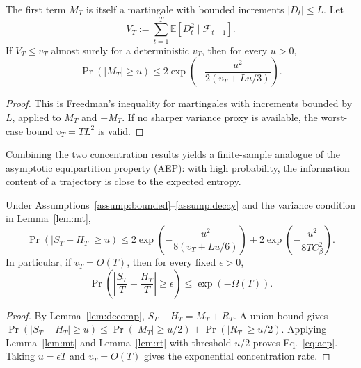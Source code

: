 \begin{lemma}[Concentration of $M_T$]
\label{lem:mt}
The first term $M_T$ is itself a martingale with bounded increments $|D_t| \le L$. Let
\begin{equation}
  V_T:=\sum_{t=1}^{T}\mathbb{E}[D_t^2\mid\mathcal{F}_{t-1}].
\end{equation}
If $V_T\le v_T$ almost surely for a deterministic $v_T$, then for every $u>0$,
\begin{equation}
  \Pr(|M_T|\ge u)
  \le 2\exp\!\left(-\frac{u^2}{2(v_T+Lu/3)}\right).
  \label{eq:mt-freedman}
\end{equation}
\end{lemma}

\begin{proof}
This is Freedman's inequality for martingales with increments bounded by $L$, applied to $M_T$ and $-M_T$. If no sharper variance proxy is available, the worst-case bound $v_T=TL^2$ is valid.
\end{proof}


Combining the two concentration results yields a finite-sample analogue of the asymptotic equipartition property (AEP): with high probability, the information content of a trajectory is close to the expected entropy.

\begin{theorem}
\label{thm:aep}
Under Assumptions~\ref{assump:bounded}--\ref{assump:decay} and the variance condition in Lemma~\ref{lem:mt},
\begin{equation}
  \Pr(|S_T-H_T|\ge u)
  \le
  2\exp\!\left(-\frac{u^2}{8(v_T+Lu/6)}\right)
  +2\exp\!\left(-\frac{u^2}{8TC_\beta^2}\right).
  \label{eq:aep}
\end{equation}
In particular, if $v_T=O(T)$, then for every fixed $\epsilon>0$,
\begin{equation}
  \Pr\!\left(\left|\frac{S_T}{T}-\frac{H_T}{T}\right|\ge\epsilon\right)
  \le \exp(-\Omega(T)).
\end{equation}
\end{theorem}

\begin{proof}
By Lemma~\ref{lem:decomp}, $S_T-H_T=M_T+R_T$. A union bound gives
$\Pr(|S_T-H_T|\ge u) \le \Pr(|M_T|\ge u/2)+\Pr(|R_T|\ge u/2)$.
Applying Lemma~\ref{lem:mt} and Lemma~\ref{lem:rt} with threshold $u/2$ proves Eq.~\eqref{eq:aep}. Taking $u=\epsilon T$ and $v_T=O(T)$ gives the exponential concentration rate.
\end{proof}


